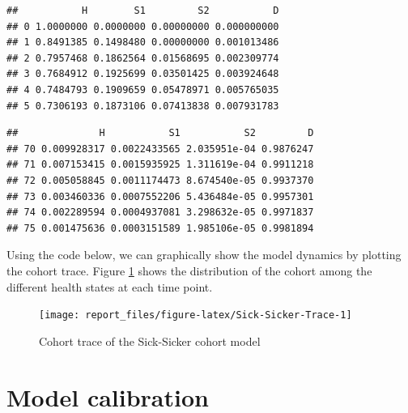 \documentclass[]{book}
\newenvironment{Shaded}{\begin{snugshade}}{\end{snugshade}}
\newcommand{\CommentTok}[1]{\textcolor[rgb]{0.56,0.35,0.01}{\textit{#1}}}
\newcommand{\KeywordTok}[1]{\textcolor[rgb]{0.13,0.29,0.53}{\textbf{#1}}}
\newcommand{\NormalTok}[1]{#1}
\newcommand{\OperatorTok}[1]{\textcolor[rgb]{0.81,0.36,0.00}{\textbf{#1}}}
\begin{document}
\begin{Shaded}
\end{Shaded}

\begin{verbatim}
##           H        S1         S2           D
## 0 1.0000000 0.0000000 0.00000000 0.000000000
## 1 0.8491385 0.1498480 0.00000000 0.001013486
## 2 0.7957468 0.1862564 0.01568695 0.002309774
## 3 0.7684912 0.1925699 0.03501425 0.003924648
## 4 0.7484793 0.1909659 0.05478971 0.005765035
## 5 0.7306193 0.1873106 0.07413838 0.007931783
\end{verbatim}

\begin{Shaded}
\end{Shaded}

\begin{verbatim}
##              H           S1           S2         D
## 70 0.009928317 0.0022433565 2.035951e-04 0.9876247
## 71 0.007153415 0.0015935925 1.311619e-04 0.9911218
## 72 0.005058845 0.0011174473 8.674540e-05 0.9937370
## 73 0.003460336 0.0007552206 5.436484e-05 0.9957301
## 74 0.002289594 0.0004937081 3.298632e-05 0.9971837
## 75 0.001475636 0.0003151589 1.985106e-05 0.9981894
\end{verbatim}

Using the code below, we can graphically show the model dynamics by plotting the cohort trace. Figure \ref{fig:Sick-Sicker-Trace} shows the distribution of the cohort among the different health states at each time point.

\begin{figure}[H]

{\centering \texttt{[image: report\_files/figure-latex/Sick-Sicker-Trace-1]} 

}

\caption{Cohort trace of the Sick-Sicker cohort model}\label{fig:Sick-Sicker-Trace}
\end{figure}

\hypertarget{calibration}{%
\chapter{Model calibration}\label{calibration}}
\end{document}
